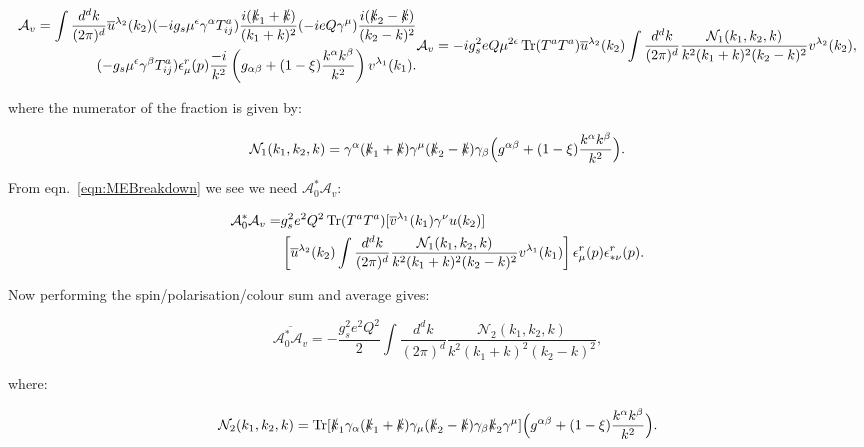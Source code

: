 		\small
			\begin{subequations}
			\begin{align*}
				\mathcal{A}_v = \int\frac{d^{d}k}{(2\pi)^{d}} \overline{u}^{\lambda_2}(k_2)
				(-ig_s\mu^\epsilon\gamma^\alpha T^a_{ij})\frac{i(\slashed k_1 + \slashed k)}{(k_1+k)^2}
				(-ieQ\gamma^\mu)\frac{i(\slashed k_2 - \slashed k)}{(k_2 - k)^2}\\
				(-g_s\mu^\epsilon\gamma^\beta T^a_{ij})
				\epsilon^r_\mu(p)\frac{-i}{k^2}\left(g_{\alpha\beta} +
				(1-\xi)\frac{k^\alpha k^\beta}{k^2}\right)v^{\lambda_1}(k_1).
			\end{align*}
			\begin{align*}
				\mathcal{A}_v = -ig_s^2eQ\mu^{2\epsilon}\Tr(T^aT^a)\overline{u}^{\lambda_2}
				(k_2)\int\frac{d^{d}k}{(2\pi)^{d}}\frac{\mathcal{N}_1(k_1, k_2, k)}{k^2(k_1+k)^2(k_2-k)^2}v^{\lambda_2}(k_2),
			\end{align*}
			\end{subequations}
		\normalsize

		where the numerator of the fraction is given by:

		\begin{equation}
			\mathcal{N}_1(k_1, k_2, k) = \gamma^\alpha(\slashed k_1 + \slashed k)\gamma^\mu(\slashed k_2 -
			\slashed k)\gamma_\beta\Big(g^{\alpha\beta} + (1-\xi)\frac{k^\alpha k^\beta}{k^2}\Big).
		\end{equation}

		From eqn.~\eqref{eqn:MEBreakdown} we see we need $\mathcal{A}_0^*\mathcal{A}_v$:

		\begin{align}
			\mathcal{A}_0^*\mathcal{A}_v = &g_s^2e^2Q^2\operatorname{Tr}(T^aT^a)[\overline{v}^{\lambda_1}(k_1)\gamma^\nu u(k_2)]\\
			&\left[\overline{u}^{\lambda_2}(k_2)\int\frac{d^{d}k}{(2\pi)^{d}}\frac{\mathcal{N}_1(k_1, k_2, k)}
			{k^2(k_1+k)^2(k_2-k)^2}v^{\lambda_1}(k_1)\right]\epsilon^r_{\mu}(p)\epsilon^r_{*\nu}(p).
		\end{align}

		Now performing the spin/polarisation/colour sum and average gives:

		\begin{equation}
			\overline{\mathcal{A}_0^*\mathcal{A}_v} = -\frac{g_s^2e^2Q^2}{2}\int\frac{d^{d}k}
			{(2\pi)^{d}}\frac{\mathcal{N}_2(k_1, k_2,k)}{k^2(k_1+k)^2(k_2-k)^2},
		\end{equation}

		where:

		\begin{equation}
			\mathcal{N}_2(k_1, k_2, k) = \operatorname{Tr}[\slashed k_1 \gamma_\alpha(\slashed k_1 + \slashed k)\gamma_\mu
			(\slashed k_2 - \slashed k)\gamma_\beta\slashed k_2\gamma^\mu]\Big(g^{\alpha\beta} + (1-\xi)\frac{k^\alpha k^\beta}{k^2}\Big).
			\label{eqn:258}
		\end{equation}

